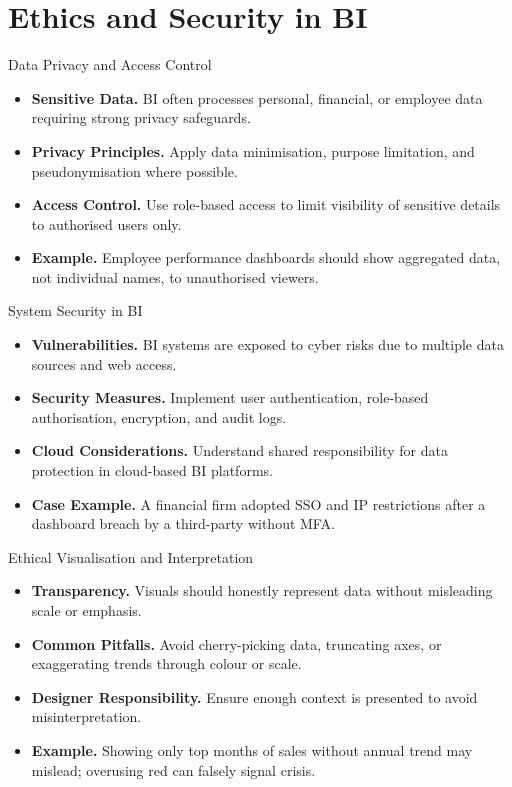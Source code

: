 \documentclass[aspectratio=169, table]{beamer}
\begin{document}
\section{Ethics and Security in BI}


\begin{frame}{Data Privacy and Access Control}
	\vspace{20pt}
	\begin{itemize}
		\item \textbf{Sensitive Data.} BI often processes personal, financial, or employee data requiring strong privacy safeguards.
		\item \textbf{Privacy Principles.} Apply data minimisation, purpose limitation, and pseudonymisation where possible.
		\item \textbf{Access Control.} Use role-based access to limit visibility of sensitive details to authorised users only.
		\item \textbf{Example.} Employee performance dashboards should show aggregated data, not individual names, to unauthorised viewers.
	\end{itemize}
\end{frame}



\begin{frame}{System Security in BI}
	\vspace{20pt}
	\begin{itemize}
		\item \textbf{Vulnerabilities.} BI systems are exposed to cyber risks due to multiple data sources and web access.
		\item \textbf{Security Measures.} Implement user authentication, role-based authorisation, encryption, and audit logs.
		\item \textbf{Cloud Considerations.} Understand shared responsibility for data protection in cloud-based BI platforms.
		\item \textbf{Case Example.} A financial firm adopted SSO and IP restrictions after a dashboard breach by a third-party without MFA.
	\end{itemize}
\end{frame}


\begin{frame}{Ethical Visualisation and Interpretation}
	\vspace{20pt}
	\begin{itemize}
		\item \textbf{Transparency.} Visuals should honestly represent data without misleading scale or emphasis.
		\item \textbf{Common Pitfalls.} Avoid cherry-picking data, truncating axes, or exaggerating trends through colour or scale.
		\item \textbf{Designer Responsibility.} Ensure enough context is presented to avoid misinterpretation.
		\item \textbf{Example.} Showing only top months of sales without annual trend may mislead; overusing red can falsely signal crisis.
	\end{itemize}
\end{frame}
\end{document}
